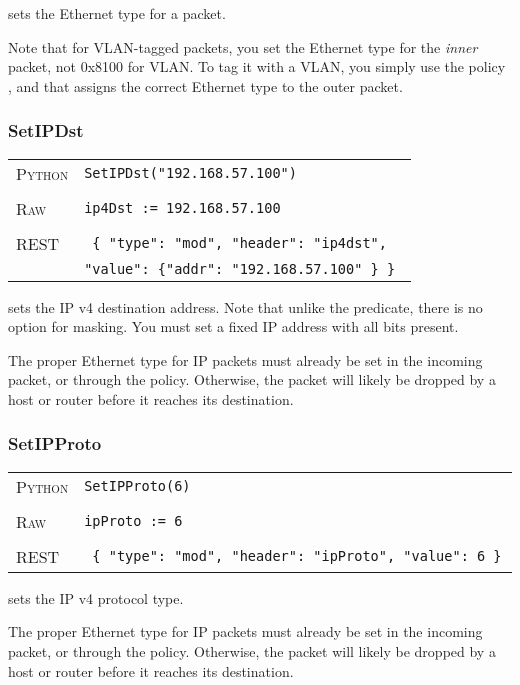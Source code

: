 sets the Ethernet type for a packet.    

Note that for VLAN-tagged packets, you set the Ethernet type for the \emph{inner} packet, not 0x8100
for VLAN.  To tag it with a VLAN, you simply use the policy , and that assigns the
correct Ethernet type to the outer packet.  

\subsubsection{SetIPDst}

\bigskip
\begin{tabularx}{\linewidth}{lX}
\textsc{Python}   & \texttt{SetIPDst("192.168.57.100")} \\ \\
\textsc{Raw}    & \texttt{ip4Dst := 192.168.57.100}     \\ \\
\textsc{REST} & \texttt{ \{ "type": "mod", "header": "ip4dst", } \\
  & \texttt{"value": \{"addr": "192.168.57.100" \} \} }
\end{tabularx}

 sets the IP v4 destination address.  Note that unlike the  predicate,
there is no option for masking.  You must set a fixed IP address with all bits present.    

The proper Ethernet type for IP packets must already be set in the incoming packet, or through the 
 policy.  Otherwise, the packet will likely be dropped by a host or router before it 
reaches its destination.

\subsubsection{SetIPProto}

\bigskip
\begin{tabularx}{\linewidth}{lX}
\textsc{Python}   & \texttt{SetIPProto(6)} \\ \\
\textsc{Raw}    & \texttt{ipProto := 6}     \\ \\
\textsc{REST} & \texttt{ \{ "type": "mod", "header": "ipProto", "value": 6 \} }
\end{tabularx}

 sets the IP v4 protocol type.      

The proper Ethernet type for IP packets must already be set in the incoming packet, or through the 
 policy.  Otherwise, the packet will likely be dropped by a host or router before it 
reaches its destination.

